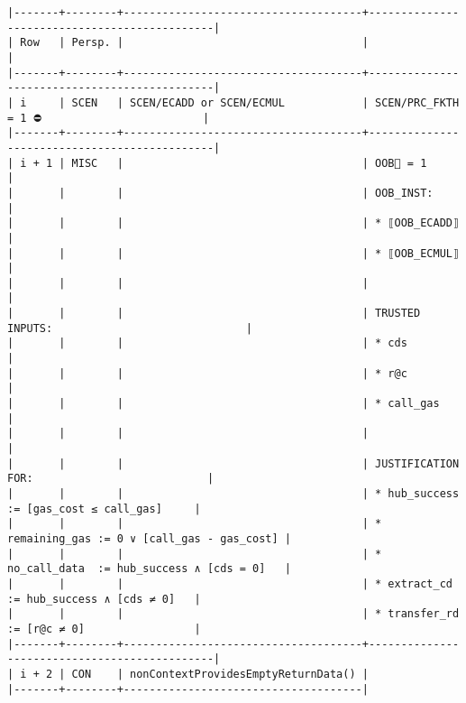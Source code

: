 \documentclass[varwidth=\maxdimen,margin=0.5cm,multi={verbatim}]{standalone}
\begin{document}
\begin{verbatim}
|-------+--------+-------------------------------------+----------------------------------------------|
| Row   | Persp. |                                     |                                              |
|-------+--------+-------------------------------------+----------------------------------------------|
| i     | SCEN   | SCEN/ECADD or SCEN/ECMUL            | SCEN/PRC_FKTH = 1 ⛔                         |
|-------+--------+-------------------------------------+----------------------------------------------|
| i + 1 | MISC   |                                     | OOB🏴 = 1                                    |
|       |        |                                     | OOB_INST:                                    |
|       |        |                                     | * ⟦OOB_ECADD⟧                                |
|       |        |                                     | * ⟦OOB_ECMUL⟧                                |
|       |        |                                     |                                              |
|       |        |                                     | TRUSTED INPUTS:                              |
|       |        |                                     | * cds                                        |
|       |        |                                     | * r@c                                        |
|       |        |                                     | * call_gas                                   |
|       |        |                                     |                                              |
|       |        |                                     | JUSTIFICATION FOR:                           |
|       |        |                                     | * hub_success   := [gas_cost ≤ call_gas]     |
|       |        |                                     | * remaining_gas := 0 ∨ [call_gas - gas_cost] |
|       |        |                                     | * no_call_data  := hub_success ∧ [cds = 0]   |
|       |        |                                     | * extract_cd    := hub_success ∧ [cds ≠ 0]   |
|       |        |                                     | * transfer_rd   := [r@c ≠ 0]                 |
|-------+--------+-------------------------------------+----------------------------------------------|
| i + 2 | CON    | nonContextProvidesEmptyReturnData() |
|-------+--------+-------------------------------------|
\end{verbatim}
\end{document}
